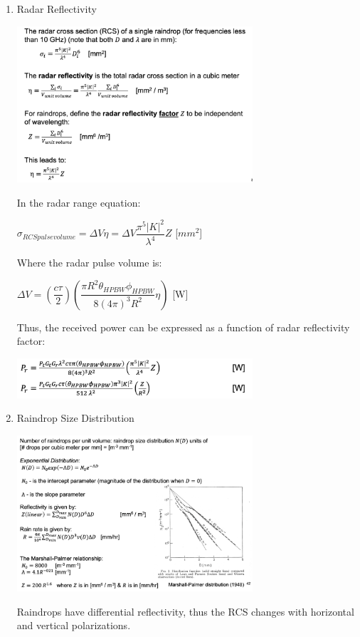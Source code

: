 \documentclass[10pt]{article}
\renewcommand{\frac}{\dfrac}
\begin{document}
\begin{enumerate}
\item Radar Reflectivity

\includegraphics[width=0.69\textwidth]{figs/radar_reflectivity.png}

\break

In the radar range equation:

$\sigma_{RCS pulse volume} = \Delta V \eta = \Delta V \frac{\pi^5 |K|^2}{\lambda^4}Z$ [$mm^2$]

Where the radar pulse volume is: 

$\Delta V = (\frac{c\tau}{2})(\frac{\pi R^2 \theta_{HPBW}\phi_{HPBW}}{8(4\pi)^3R^2}\eta)$ [W]

Thus, the received power can be expressed as a function of radar reflectivity factor:

\includegraphics[width=0.69\textwidth]{figs/radar_power_from_reflectivity.png}


\item Raindrop Size Distribution

\includegraphics[width=0.69\textwidth]{figs/raindrop_size_dist.png}

Raindrops have differential reflectivity, thus the RCS changes with horizontal and vertical polarizations.



\end{enumerate}
\end{document}
